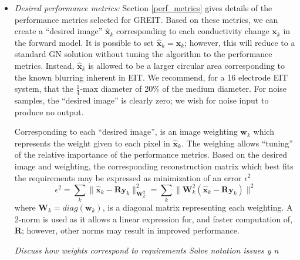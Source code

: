 \documentclass[12pt]{iopart}
\newcommand{\xB}{\mbox{$\mathbf{x}$}}
\newcommand{\xH}{\mbox{$\mathbf{\hat x}$}}
\newcommand{\yB}{\mbox{$\mathbf{y}$}}
\newcommand{\wB}{\mbox{$\mathbf{w}$}}
\newcommand{\RB}{\mbox{$\mathbf{R}$}}
\newcommand{\WB}{\mbox{$\mathbf{W}$}}
\begin{document}
\begin{itemize}
{\em electrode movement artefacts}
occur when the electrodes move, either with posture change
or with chest movements due to breathing. Several reports
have demonstrated the serious impact of such movements on
EIT images (Adler et al, 1996, Patterson et al, 2005,
Coulombe et al 2005). In order to reduce the impact
of such movement on EIT reconstruction, Soleimani et al
(2006) showed that it is possible to create an
augmented forward model based on both the conductivity change
and electrode movement, which resulted in reduced movement 
artefacts in the reconstructed images. In order
to use this capability in GREIT, we specify that a
set of ``noise'' measurements due to electrode movement 
by incorportated. This is currently implemented from
deformations of the FEM (G\'omez-Laberge and Adler, 2008),
but may be based on a calibration protocol in an
implemented system.

 
\item[] 
{\em Desired performance metrics:}
Section \ref{perf_metrics} gives details of the 
performance metrics selected for GREIT. Based on these
metrics, we can create a ``desired image''
$\xH_k$ corresponding to each conductivity change
$\xB_k$ in the forward model. It is possible to set
$\xH_k = \xB_k$; however, this will reduce to a standard
GN solution without tuning the algorithm to the 
performance metrics. Instead, $\xH_k$ is allowed to be
a larger circular area corresponding to the known
blurring inherent in EIT. We recommend, for a 16 electrode
EIT system, that the $\frac{1}{4}$-max
diameter of 20\% of the medium diameter.
For noise samples, the ``desired image'' is clearly
zero; we wish for noise input to produce no output.

Corresponding to each ``desired image'', is an image
weighting $\wB_k$ which represents the weight given to 
each pixel in $\xH_k$. The weighing allows ``tuning''
of the relative importance of the  performance metrics.
Based on the desired image and weighting, the corresponding
reconstruction matrix which best fits the requirements
may be expressed as minimization of an error $\epsilon^2$
\begin{equation}
\label{GREIT_norm}
\epsilon^2 = \sum_k \| \xH_k - \RB \yB_k \|_{\WB^2_k}^2
    = \sum_k \| \WB^2_k (\xH_k - \RB \yB_k ) \|^2
\end{equation}
where $\WB_k = diag( \wB_k)$, is a diagonal matrix representing
each weighting. A 2-norm is used as it allows
a linear expression for, and faster computation of, $\RB$;
however, other norms may result in improved performance.

{\em
Discuss how weights correspond to requirements
Solve notation issues y n
}
\end{itemize}
\end{document}
